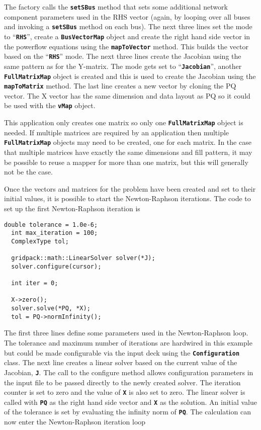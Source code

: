 The factory calls the \texttt{\textbf{setSBus}} method that sets some additional
network component parameters used in the RHS vector (again, by looping over all buses and invoking a \texttt{\textbf{setSBus}} method on each bus). The next three lines set the mode to ``\texttt{\textbf{RHS}}'', create a \texttt{\textbf{BusVectorMap}} object and create the right hand side vector in the powerflow equations using the \texttt{\textbf{mapToVector}} method. This builds the vector based on the ``\texttt{\textbf{RHS}}'' mode. The next three lines create the Jacobian using the same pattern as for the Y-matrix. The mode gets set to ``\texttt{\textbf{Jacobian}}'', another \texttt{\textbf{FullMatrixMap}} object is created and this is used to create the Jacobian using the \texttt{\textbf{mapToMatrix}} method. The last line creates a new vector by cloning the PQ vector. The X vector has the same dimension and data layout as PQ so it could be used with the \texttt{\textbf{vMap}} object.

This application only creates one matrix so only one
\texttt{\textbf{FullMatrixMap}} object is needed. If multiple matrices are
required by an application then multiple \texttt{\textbf{FullMatrixMap}} objects
may need to be created, one for each matrix. In the case that multiple matrices
have exactly the same dimensions and fill pattern, it may be possible to reuse a
mapper for more than one matrix, but this will generally not be the case.

Once the vectors and matrices for the problem have been created and set to their initial values, it is possible to start the Newton-Raphson iterations. The code to set up the first Newton-Raphson iteration is

{
\color{red}
\begin{Verbatim}[fontseries=b]
  double tolerance = 1.0e-6;
  int max_iteration = 100;
  ComplexType tol;

  gridpack::math::LinearSolver solver(*J);
  solver.configure(cursor);

  int iter = 0;

  X->zero(); 
  solver.solve(*PQ, *X);
  tol = PQ->normInfinity();
\end{Verbatim}
}

The first three lines define some parameters used in the Newton-Raphson loop. The tolerance and maximum number of iterations are hardwired in this example but could be made configurable via the input deck using the \texttt{\textbf{Configuration}} class. The next line creates a linear solver based on the current value of the Jacobian, \texttt{\textbf{J}}. The call to the configure method allows configuration parameters in the input file to be passed directly to the newly created solver. The iteration counter is set to zero and the value of \texttt{\textbf{X}} is also set to zero. The linear solver is called with \texttt{\textbf{PQ}} as the right hand side vector and \texttt{\textbf{X}} as the solution. An initial value of the tolerance is set by evaluating the infinity norm of \texttt{\textbf{PQ}}. The calculation can now enter the Newton-Raphson iteration loop

